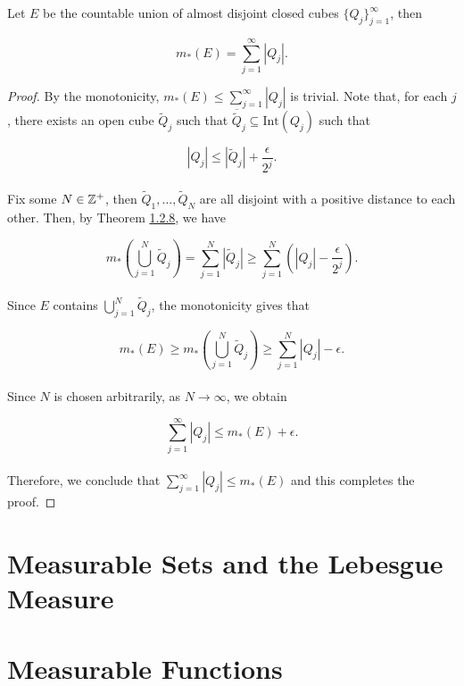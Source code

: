 \documentclass[12pt, a4paper, openany, twoside]{book}
\theoremstyle{definition}
\theoremstyle{remark}
\newcommand{\Int}{{\mathrm{Int}}}
\newcommand{\ov}{\overline}
\theoremstyle{plain}
\numberwithin{equation}{section}
\begin{document}
\vspace{5mm}
\begin{tcolorbox}[colback=yellow!10!white,colframe=red!75!black,title=Theorem 1.2.9]\label{Theorem 1.2.9}
    Let $E$ be the countable union of almost disjoint closed cubes $\{Q_j\}_{j=1}^{\infty}$, then

    \[m_*(E)=\sum_{j=1}^{\infty}{|Q_j|}.\]
\end{tcolorbox}
\begin{proof}
    By the monotonicity, $m_*(E)\leq\sum_{j=1}^{\infty}{|Q_j|}$ is trivial. Note that, for each $j$, there exists an open cube $\tilde{Q}_j$ such that $\ov{\tilde{Q}}_j\subseteq\Int{(Q_j)}$ such that 

    \[|Q_j|\leq |\tilde{Q}_j|+\frac{\epsilon}{2^j}.\]
    \\
    Fix some $N\in{\mathbb {Z}}^+$, then $\tilde{Q}_1,\dots,\tilde{Q}_N$ are all disjoint with a positive distance to each other. Then, by Theorem \hyperref[Theorem 1.2.8]{1.2.8}, we have 

    \[m_*\left(\bigcup_{j=1}^{N}{\tilde{Q}_j}\right)=\sum_{j=1}^{N}{|\tilde{Q}_j|}\geq \sum_{j=1}^{N}{\left(|Q_j|-\frac{\epsilon}{2^j}\right)}.\]
    \\
    Since $E$ contains $\bigcup_{j=1}^{N}{\tilde{Q}_j}$, the monotonicity gives that

    \[m_*(E)\geq m_*\left(\bigcup_{j=1}^{N}{\tilde{Q}_j}\right)\geq\sum_{j=1}^{N}{|Q_j|-\epsilon}.\]
    \\
    Since $N$ is chosen arbitrarily, as $N\rightarrow\infty$, we obtain
    
    \[\sum_{j=1}^{\infty}{|Q_j|}\leq m_*(E)+\epsilon.\]
    \\
    Therefore, we conclude that $\sum_{j=1}^{\infty}{|Q_j|}\leq m_*(E)$ and this completes the proof.
\end{proof}





\newpage
\section{Measurable Sets and the Lebesgue Measure}






\newpage
\section{Measurable Functions}
\end{document}

